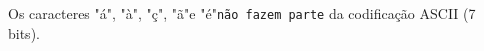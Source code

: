 \documentclass[12pt,varwidth=16cm,border=1pt]{standalone}
\begin{document}
Os caracteres "á", "à", "ç", "ã"\space e "é"\space \verb+não fazem parte+ da codificação ASCII (7 bits).
\end{document}
